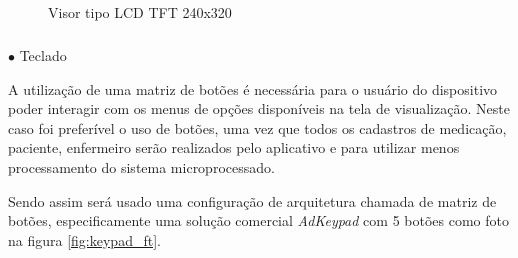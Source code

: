         \begin{figure}[H]
        \centering
        \hspace{0.1\textwidth}
        \caption{Visor tipo LCD TFT 240x320}
        \label{fig:display_lcd}
        \end{figure}
        
        \subparagraph*{}$\bullet$ Teclado \hfill
        
        A utilização de uma matriz de botões é necessária para o usuário do dispositivo poder interagir com os menus de opções disponíveis na tela de visualização. Neste caso foi preferível o uso de botões, uma vez que todos os cadastros de medicação, paciente, enfermeiro serão realizados pelo aplicativo e para utilizar menos processamento do sistema microprocessado. 
        
        
        Sendo assim será usado uma configuração de arquitetura chamada de matriz de botões, especificamente uma solução comercial \textit{AdKeypad} com 5 botões como foto na figura \ref{fig:keypad_ft}.
        
